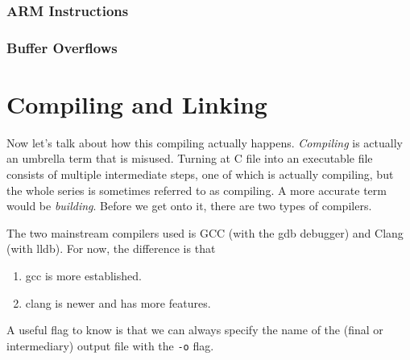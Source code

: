 \documentclass{article}
\begin{document}
    \subsubsection{ARM Instructions}

      

    \subsubsection{Buffer Overflows}

\section{Compiling and Linking}

  Now let's talk about how this compiling actually happens. \textit{Compiling} is actually an umbrella term that is misused. Turning at C file into an executable file consists of multiple intermediate steps, one of which is actually compiling, but the whole series is sometimes referred to as compiling. A more accurate term would be \textit{building}. Before we get onto it, there are two types of compilers. 

  \begin{definition}
    The two mainstream compilers used is GCC (with the gdb debugger) and Clang (with lldb). For now, the difference is that 
    \begin{enumerate}
      \item gcc is more established. 
      \item clang is newer and has more features. 
    \end{enumerate}
    A useful flag to know is that we can always specify the name of the (final or intermediary) output file with the \texttt{-o} flag. 
  \end{definition}
\end{document}
